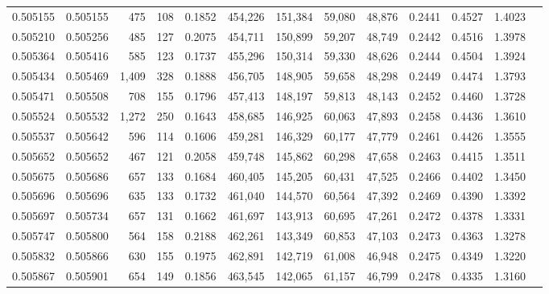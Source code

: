 \begin{tabular}{rrrrrrrrrrrrr}
0.505155 & 0.505155 &   475 &   108 &                                     0.1852 & 454,226 & 151,384 &  59,080 &  48,876 & 0.2441 & 0.4527 & 1.4023 \\
0.505210 & 0.505256 &   485 &   127 &                                     0.2075 & 454,711 & 150,899 &  59,207 &  48,749 & 0.2442 & 0.4516 & 1.3978 \\
0.505364 & 0.505416 &   585 &   123 &                                     0.1737 & 455,296 & 150,314 &  59,330 &  48,626 & 0.2444 & 0.4504 & 1.3924 \\
0.505434 & 0.505469 & 1,409 &   328 &                                     0.1888 & 456,705 & 148,905 &  59,658 &  48,298 & 0.2449 & 0.4474 & 1.3793 \\
0.505471 & 0.505508 &   708 &   155 &                                     0.1796 & 457,413 & 148,197 &  59,813 &  48,143 & 0.2452 & 0.4460 & 1.3728 \\
0.505524 & 0.505532 & 1,272 &   250 &                                     0.1643 & 458,685 & 146,925 &  60,063 &  47,893 & 0.2458 & 0.4436 & 1.3610 \\
0.505537 & 0.505642 &   596 &   114 &                                     0.1606 & 459,281 & 146,329 &  60,177 &  47,779 & 0.2461 & 0.4426 & 1.3555 \\
0.505652 & 0.505652 &   467 &   121 &                                     0.2058 & 459,748 & 145,862 &  60,298 &  47,658 & 0.2463 & 0.4415 & 1.3511 \\
0.505675 & 0.505686 &   657 &   133 &                                     0.1684 & 460,405 & 145,205 &  60,431 &  47,525 & 0.2466 & 0.4402 & 1.3450 \\
0.505696 & 0.505696 &   635 &   133 &                                     0.1732 & 461,040 & 144,570 &  60,564 &  47,392 & 0.2469 & 0.4390 & 1.3392 \\
0.505697 & 0.505734 &   657 &   131 &                                     0.1662 & 461,697 & 143,913 &  60,695 &  47,261 & 0.2472 & 0.4378 & 1.3331 \\
0.505747 & 0.505800 &   564 &   158 &                                     0.2188 & 462,261 & 143,349 &  60,853 &  47,103 & 0.2473 & 0.4363 & 1.3278 \\
0.505832 & 0.505866 &   630 &   155 &                                     0.1975 & 462,891 & 142,719 &  61,008 &  46,948 & 0.2475 & 0.4349 & 1.3220 \\
0.505867 & 0.505901 &   654 &   149 &                                     0.1856 & 463,545 & 142,065 &  61,157 &  46,799 & 0.2478 & 0.4335 & 1.3160 \\

\end{tabular}
